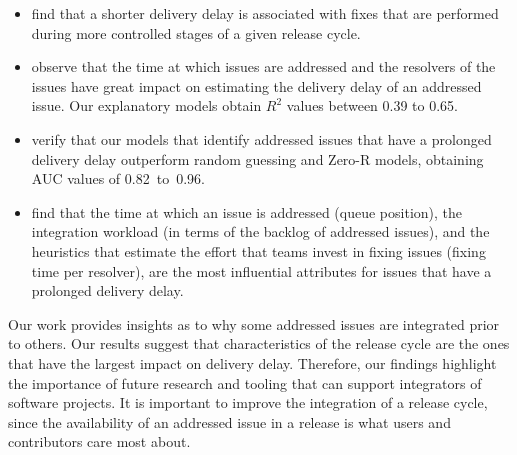 \begin{itemize}
		\item find that a shorter delivery delay is associated with
			fixes that are performed during more controlled stages
			of a given release cycle.\\

		\item observe that the time at which issues are addressed and the
			resolvers of the issues have great impact on estimating
			the delivery delay of an addressed issue.  Our explanatory
			models obtain $R^2$ values between 0.39 to 0.65. \\

		\item verify that our models that identify addressed issues that
			have a prolonged delivery delay outperform random
			guessing and Zero-R models, obtaining AUC values of 0.82~to~0.96.\\

		\item find that the time at which an issue is addressed (queue
			position), the integration workload (in terms of the
			backlog of addressed issues), and the
			heuristics that estimate the effort that teams invest in
			fixing issues (fixing time per resolver), are the
			most influential attributes for issues that have 
			a prolonged delivery delay. \\

	\end{itemize}

Our work provides insights as to why some addressed issues are integrated prior
to others. Our results suggest that characteristics of the release cycle are the
ones that have the largest impact on delivery delay. Therefore, our findings
highlight the importance of future research and tooling that can support
integrators of software projects. It is important to improve the integration \DIFdelbegin {}\DIFdelend \DIFaddbegin {}\DIFaddend of a release cycle, since the availability of an addressed issue
in a release is what users and contributors care most about. 

